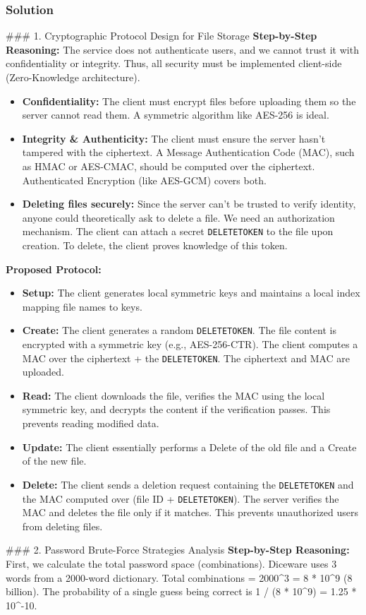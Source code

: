 \documentclass{article}
\begin{document}
\subsubsection*{Solution}
\#\#\# 1. Cryptographic Protocol Design for File Storage
\textbf{Step-by-Step Reasoning:}
The service does not authenticate users, and we cannot trust it with confidentiality or integrity. Thus, all security must be implemented client-side (Zero-Knowledge architecture).
\begin{itemize}
    \item \textbf{Confidentiality:} The client must encrypt files before uploading them so the server cannot read them. A symmetric algorithm like AES-256 is ideal.
    \item \textbf{Integrity \& Authenticity:} The client must ensure the server hasn't tampered with the ciphertext. A Message Authentication Code (MAC), such as HMAC or AES-CMAC, should be computed over the ciphertext. Authenticated Encryption (like AES-GCM) covers both.
    \item \textbf{Deleting files securely:} Since the server can't be trusted to verify identity, anyone could theoretically ask to delete a file. We need an authorization mechanism. The client can attach a secret \texttt{DELETETOKEN} to the file upon creation. To delete, the client proves knowledge of this token.

\end{itemize}
\textbf{Proposed Protocol:}
\begin{itemize}
    \item[\textbf{1.}] \textbf{Setup:} The client generates local symmetric keys and maintains a local index mapping file names to keys.
    \item[\textbf{2.}] \textbf{Create:} The client generates a random \texttt{DELETETOKEN}. The file content is encrypted with a symmetric key (e.g., AES-256-CTR). The client computes a MAC over the ciphertext + the \texttt{DELETETOKEN}. The ciphertext and MAC are uploaded.
    \item[\textbf{3.}] \textbf{Read:} The client downloads the file, verifies the MAC using the local symmetric key, and decrypts the content if the verification passes. This prevents reading modified data.
    \item[\textbf{4.}] \textbf{Update:} The client essentially performs a Delete of the old file and a Create of the new file.
    \item[\textbf{5.}] \textbf{Delete:} The client sends a deletion request containing the \texttt{DELETETOKEN} and the MAC computed over (file ID + \texttt{DELETETOKEN}). The server verifies the MAC and deletes the file only if it matches. This prevents unauthorized users from deleting files.

\end{itemize}
\#\#\# 2. Password Brute-Force Strategies Analysis
\textbf{Step-by-Step Reasoning:}
First, we calculate the total password space (combinations).
Diceware uses 3 words from a 2000-word dictionary.
Total combinations = 2000\textasciicircum{}3 = 8 * 10\textasciicircum{}9 (8 billion).
The probability of a single guess being correct is 1 / (8 * 10\textasciicircum{}9) = 1.25 * 10\textasciicircum{}-10.
\end{document}
